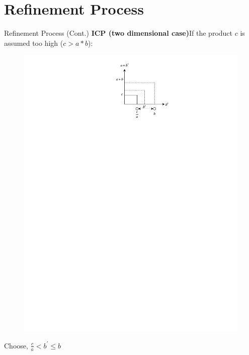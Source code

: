 \documentclass[]{beamer}
\begin{document}
\section{Refinement Process}
\begin{frame}{Refinement Process (Cont.)}
    \textbf{ICP (two dimensional case)}\newline If the product $c$ is assumed too high ($c > a \ast b$):
    \begin{overlayarea}{12cm}{5.5cm}
    	\centering
    	\begin{minipage}{5cm}
    		\vspace{1cm}
    		\begin{figure}	\includegraphics[scale=0.9]{../figures/ICP2_1.pdf}
    		\end{figure}
    		\centering
    		\vspace{-0.5cm}
    		Choose, $\frac{c}{a} < b^\prime \leq b$
    	\end{minipage}
    	\begin{minipage}{5cm}

\end{minipage}
\end{overlayarea}
\end{frame}
\end{document}
